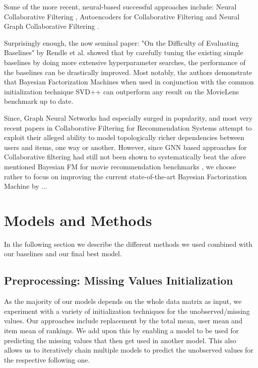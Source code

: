 \documentclass[10pt,conference,compsocconf]{IEEEtran}
\begin{document}
    Some of the more recent, neural-based successful approaches include: Neural Collaborative Filtering \cite{DBLP:journals/corr/abs-1708-05031}, Autoencoders for Collaborative Filtering \cite{inproceedings} and Neural Graph Collaborative Filtering \cite{ngcf}.

    Surprisingly enough, the now seminal paper: "On the Difficulty of Evaluating Baselines" by Rendle et al. \cite{rendle_difficulty_2019} showed that by carefully tuning the existing simple baselines by doing more extensive hyperparameter searches, the performance of the baselines can be drastically improved.
    Most notably, the authors demonstrate that Bayesian Factorization Machines \cite{freudenthaler_bayesian_2011, salakhutdinov_bayesian_2008} when used in conjunction with the common initialization technique SVD++ \cite{koren_factorization_2008} can outperform any result on the MovieLens benchmark up to date.

    Since, Graph Neural Networks had especially surged in popularity, and most very recent papers in Collaborative Filtering for Recommendation Systems attempt to exploit their alleged ability to model topologically richer dependencies between users and items, one way or another.
    However, since GNN based approaches for Collaborative filtering had still not been shown to systematically beat the afore mentioned Bayesian FM for movie recommendation benchmarks \cite{gnn_survey}, we choose rather to focus on improving the current state-of-the-art Bayesian Factorization Machine by ...


    \section{Models and Methods}
    In the following section we describe the different methods we used combined with our baselines and our final best model.


    \subsection{Preprocessing: Missing Values Initialization}
    As the majority of our models depends on the whole data matrix as input, we experiment with a variety of initialization techniques for the unobserved/missing values.
    Our approaches include replacement by the total mean, user mean and item mean of rankings.
    We add upon this by enabling a model to be used for predicting the missing values that then get used in another model.
    This also allows us to iteratively chain multiple models to predict the unobserved values for the respective following one.
\end{document}

